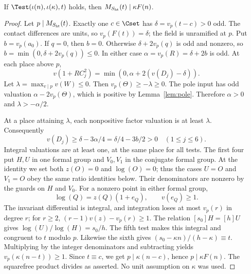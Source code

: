 \begin{lemma}[Divisibility]\label{lem:test}
If $\Test(\iota(n),\iota(\kappa),t)$ holds, then
$M_{S_{\rm ht}}(t)\mid\kappa F(n)$.
\end{lemma}
\begin{proof}
Let $p\mid M_{S_{\rm ht}}(t)$. Exactly one $c\in\Cset$ has
$\delta=v_p(t-c)>0$ odd. The contact differences are units, so
$v_p(F(t))=\delta$; the field is unramified at $p$. Put $b=v_p(a_0)$.
If $q=0$, then $b=0$. Otherwise $\delta+2v_p(q)$ is odd and
nonzero, so $b=\min(0,\delta+2v_p(q))\le0$. In either case
$\alpha=v_p(R)=\delta+2b$ is odd. At each place above $p$,
\[
 v(1+RC_j^2)=\min(0,\alpha+2(v(D_j)-\delta)).
\]
Let $\lambda=\max_{v\mid p}v(W)\le0$. Then
$v_p(\Theta)\ge-\lambda\ge0$. The pole input has odd valuation
$\alpha-2v_p(\Theta)$, which is positive by Lemma~\ref{lem:pole}.
Therefore $\alpha>0$ and $\lambda> -\alpha/2$.

At a place attaining $\lambda$, each nonpositive factor valuation is
at least $\lambda$. Consequently
\[
 v(D_j)\ge\delta-3\alpha/4=\delta/4-3b/2>0
 \quad(1\le j\le6).
\]
Integral valuations are at least one, at the same place for all tests.
The first four put $H,U$ in one formal group and $V_0,V_1$ in the
conjugate formal group. At the identity we set both $z(O)=0$ and
$\log(O)=0$; thus the cases $U=O$ and $V_1=O$ obey the same ratio
identities below. Their denominators are nonzero by the guards on
$H$ and $V_0$. For a nonzero point in either formal group,
\[
 \log(Q)=z(Q)(1+e_Q),\qquad v(e_Q)\ge1.
\]
The invariant differential is integral, and integration loses at most
$v_p(r)$ in degree $r$; for $r\ge2$,
$(r-1)v(z)-v_p(r)\ge1$.
The relation $[s_0]H=[h]U$ gives
$\log(U)/\log(H)=s_0/h$. The fifth test makes this integral and
congruent to $t$ modulo $p$. Likewise the sixth gives
$(s_0-\kappa n)/(h-\kappa)\equiv t$.
Multiplying by the integer denominators and subtracting yields
$v_p(\kappa(n-t))\ge1$. Since $t\equiv c$, we get
$p\mid\kappa(n-c)$, hence $p\mid\kappa F(n)$. The squarefree
product divides as asserted. No unit assumption on $\kappa$ was used.
\end{proof}


